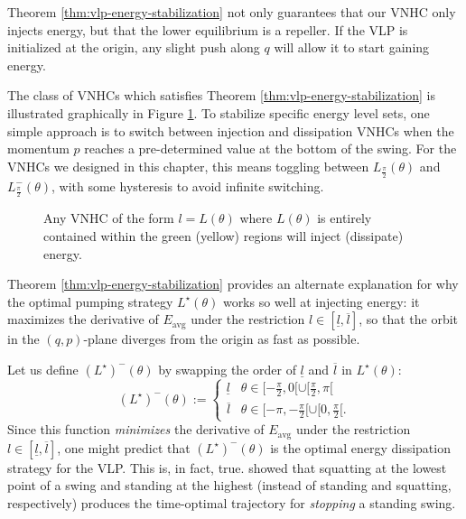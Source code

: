 \begin{remark}
   Theorem \ref{thm:vlp-energy-stabilization} not only guarantees that our VNHC
   only injects energy, but that the lower equilibrium is a repeller. 
   If the VLP is initialized at the origin, any slight push along
   \(q\) will allow it to start gaining energy.
\end{remark}

The class of VNHCs which satisfies Theorem \ref{thm:vlp-energy-stabilization} is
illustrated graphically in Figure \ref{fig:vlp-energy-in-out}. 
To stabilize specific energy level sets, one simple approach is to switch
between injection and dissipation VNHCs when the momentum \(p\) reaches
a pre-determined value at the bottom of the swing.
For the VNHCs we designed in this chapter, this means toggling
between \(L_\frac{\pi}{2}(\theta)\) and \(L^{-}_\frac{\pi}{2}(\theta)\),
with some hysteresis to avoid infinite switching.  

\begin{figure}
   \centering
   
   \caption{Any VNHC of the form \(l = L(\theta)\) where \(L(\theta)\)
      is entirely contained within
      the green (yellow) regions will inject (dissipate) energy.}
      \label{fig:vlp-energy-in-out}
\end{figure}

Theorem \ref{thm:vlp-energy-stabilization} provides an alternate
explanation for why the optimal pumping strategy \(L^\star(\theta)\) works
so well at injecting energy: it maximizes the derivative of \(E_\text{avg}\)
under the restriction \(l \in [\underline{l},\overline{l}]\), so that the orbit
in the \((q,p)\)-plane diverges from the origin as fast as possible. 

Let us define \((L^\star)^{-}(\theta)\) by swapping the order of 
\(\underline{l}\) and \(\overline{l}\) in \(L^\star(\theta)\): 
\[
   (L^\star)^-(\theta) := \begin{cases}
      \underline{l} & \theta \in [-\frac{\pi}{2},0[ \cup [\frac{\pi}{2}, \pi[ \\
      \overline{l} & \theta \in [-\pi, -\frac{\pi}{2}[ \cup [0,\frac{\pi}{2}[ 
      .
   \end{cases}
\]
Since this function \textit{minimizes} the derivative of \(E_\text{avg}\) under
the restriction \(l \in [\underline{l},\overline{l}]\), one might predict that 
\((L^\star)^{-}(\theta)\) is the optimal energy dissipation strategy for the VLP.
This is, in fact, true. \citet{pumping_swing_standing_squatting} showed 
that squatting at the lowest point of a swing and standing at the highest
(instead of standing and squatting, respectively) produces the
time-optimal trajectory for \textit{stopping} a standing swing. 

